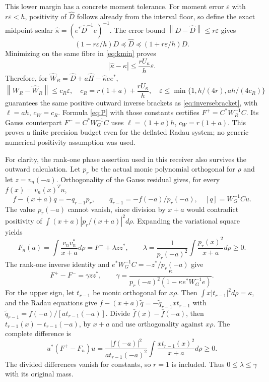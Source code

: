 \documentclass[11pt]{article}
\newcommand{\norm}[1]{\left\lVert#1\right\rVert}
\begin{document}
This lower margin has a concrete moment tolerance. For moment
error $\varepsilon$ with $r\varepsilon<h$, positivity of
$\widehat D$ follows already from the interval floor, so define
the exact midpoint scalar $\widehat\kappa=(e^*\widehat D^{-1}e)^{-1}$.
The error bound $\norm{D-\widehat D}\le r\varepsilon$ gives
\[
 (1-r\varepsilon/h)D\preceq\widehat D
 \preceq(1+r\varepsilon/h)D.
\]
Minimizing on the same fibre in \eqref{eq:kmin} proves
\begin{equation}\label{eq:kerror}
 |\widehat\kappa-\kappa|\le
                  \frac{rU_\kappa}{h}\varepsilon.
\end{equation}
Therefore, for
$\widehat W_R=\widehat D+a\widehat H-\widehat\kappa ee^*$,
\begin{equation}\label{eq:radauprecision}
 \norm{W_R-\widehat W_R}\le c_R\varepsilon,
 \quad c_R=r(1+a)+\frac{rU_\kappa}{h},\quad
 \varepsilon\le\min\{1,h/(4r),ah/(4c_R)\}
\end{equation}
guarantees the same positive outward inverse brackets as
\eqref{eq:inversebracket}, with $\ell=ah$, $c_W=c_R$.
Formula \eqref{eq:P} with those constants certifies
$F^+=C^*W_R^{-1}C$. Its Gauss counterpart
$F^-=C^*W_G^{-1}C$ uses $\ell=(1+a)h$, $c_W=r(1+a)$.
This proves a finite precision budget even for the deflated Radau
system; no generic numerical positivity assumption was used.

For clarity, the rank-one phase assertion used in this receiver
also survives the outward calculation. Let $p_r$ be the actual
monic polynomial orthogonal for $\rho$ and let $z=v_n(-a)$.
Orthogonality of the Gauss residual gives, for every
$f(x)=v_n(x)^Tu$,
\[
 f-(x+a)q=-q_{r-1}p_r,\qquad q_{r-1}=-f(-a)/p_r(-a),
 \quad[q]=W_G^{-1}Cu.
\]
The value $p_r(-a)$ cannot vanish, since division by $x+a$
would contradict positivity of $\int(x+a)|p_r/(x+a)|^2d\rho$.
Expanding the variational square yields
\begin{equation}\label{eq:phase}
 F_n(a)=\int\frac{v_nv_n^*}{x+a}d\rho
       =F^-+\lambda zz^*,\qquad
 \lambda=\frac1{p_r(-a)^2}\int\frac{p_r(x)^2}{x+a}d\rho\ge0.
\end{equation}
The rank-one inverse identity and
$e^*W_G^{-1}C=-z^*/p_r(-a)$ give
\[
 F^+-F^-=\gamma zz^*,\qquad
 \gamma=\frac{\kappa}{p_r(-a)^2(1-\kappa e^*W_G^{-1}e)}.
\]
For the upper sign, let $t_{r-1}$ be monic orthogonal for $x\rho$.
Then $\int x|t_{r-1}|^2d\rho=\kappa$, and the Radau equations
give $f-(x+a)\widetilde q=-\widetilde q_{r-1}xt_{r-1}$ with
$\widetilde q_{r-1}=f(-a)/[a t_{r-1}(-a)]$.
Divide $\bar f(x)-\bar f(-a)$, then
$t_{r-1}(x)-t_{r-1}(-a)$, by $x+a$ and use orthogonality
against $x\rho$. The complete difference is
\[
 u^*(F^+-F_n)u=
 \frac{|f(-a)|^2}{a t_{r-1}(-a)^2}
                   \int\frac{x t_{r-1}(x)^2}{x+a}d\rho\ge0.
\]
The divided differences vanish for constants, so $r=1$ is included.
Thus $0\le\lambda\le\gamma$ with its original mass.
\end{document}
